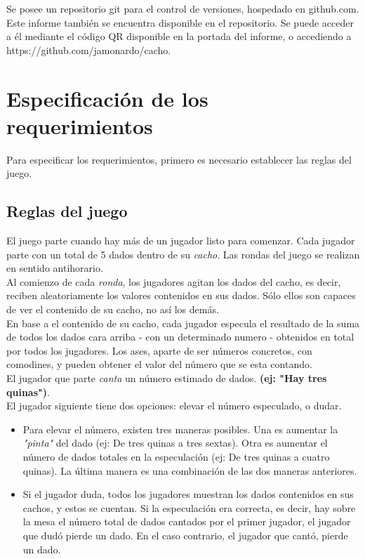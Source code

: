 \documentclass[a4paper,11pt]{article}
\begin{document}
Se posee un repositorio git para el control de versiones, hospedado en 
github.com. Este informe también se encuentra disponible en el repositorio.
Se puede acceder a él mediante el código QR disponible en la portada del 
informe, o accediendo a https://github.com/jamonardo/cacho.

\newpage
\section{Especificación de los requerimientos}
	
	Para especificar los requerimientos, primero es necesario establecer 
las reglas del juego.

\subsection{Reglas del juego}

	El juego parte cuando hay más de un jugador listo para comenzar.
 Cada jugador parte con un total de 5 dados dentro de su \textit{cacho}. Las 
rondas del juego se realizan en sentido antihorario.\\

	Al comienzo de cada \textit{ronda}, los jugadores agitan los dados del 
cacho, es decir, reciben aleatoriamente los valores contenidos en sus dados.
Sólo ellos son capaces de ver el contenido de su cacho, no así los demás. \\

	En base a el contenido de su cacho, cada jugador especula el resultado 
de la suma de todos los dados cara arriba - con un determinado numero - 
obtenidos en total por todos los jugadores. Los ases, aparte de ser números
concretos, con comodines, y pueden obtener el valor del número que se esta 
contando.\\

	El jugador que parte \textit{canta} un número estimado de dados. 
\textbf{(ej: "Hay tres quinas")}. \\

	El jugador siguiente tiene dos opciones: elevar el número especulado,
o dudar. \\

\begin{itemize}
\item Para elevar el número, existen tres maneras posibles. Una es aumentar la 
\textit{"pinta"} del dado (ej: De tres quinas a tres sextas). Otra es aumentar
 el número de dados totales en la especulación (ej: De tres quinas a cuatro 
quinas). La última manera es una combinación de las dos maneras anteriores.
\item Si el jugador duda, todos los jugadores muestran los dados contenidos
en sus cachos, y estos se cuentan. Si la especulación era correcta, es decir,
hay sobre la mesa el número total de dados cantados por el primer jugador, el 
jugador que dudó pierde un dado. En el caso contrario, el jugador que cantó,
pierde un dado.
\end{itemize}
\end{document}
